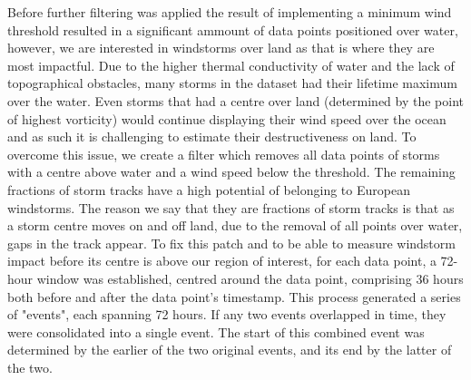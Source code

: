         
        Before further filtering was applied the result of implementing a minimum wind threshold resulted in a significant ammount of data points positioned over water, however, we are interested in windstorms over land as that is where they are most impactful. Due to the higher thermal conductivity of water and the lack of topographical obstacles, many storms in the dataset had their lifetime maximum over the water. Even storms that had a centre over land (determined by the point of highest vorticity) would continue displaying their wind speed over the ocean and as such it is challenging to estimate their destructiveness on land. To overcome this issue, we create a filter which removes all data points of storms with a centre above water and a wind speed below the threshold. The remaining fractions of storm tracks have a high potential of belonging to European windstorms. The reason we say that they are fractions of storm tracks is that as a storm centre moves on and off land, due to the removal of all points over water, gaps in the track appear. To fix this patch and to be able to measure windstorm impact before its centre is above our region of interest, for each data point, a 72-hour window was established, centred around the data point, comprising 36 hours both before and after the data point's timestamp. This process generated a series of "events", each spanning 72 hours. If any two events overlapped in time, they were consolidated into a single event. The start of this combined event was determined by the earlier of the two original events, and its end by the latter of the two.
        
